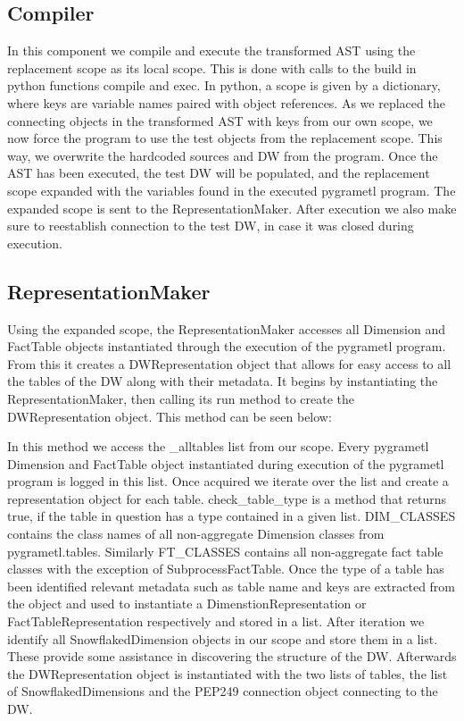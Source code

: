 \subsection{Compiler}
In this component we compile and execute the transformed AST using the replacement scope as its local scope. This is done with calls to the build in python functions compile and exec. In python, a scope is given by a dictionary, where keys are variable names paired with object references. As we replaced the connecting objects in the transformed AST with keys from our own scope, we now force the program to use the test objects from the replacement scope. This way, we overwrite the hardcoded sources and DW from the program. Once the AST has been executed, the test DW will be populated, and the replacement scope expanded with the variables found in the executed pygrametl program. The expanded scope is sent to the RepresentationMaker. After execution we also make sure to reestablish connection to the test DW, in case it was closed during execution.

\subsection{RepresentationMaker}
Using the expanded scope, the RepresentationMaker accesses all Dimension and FactTable objects instantiated through the execution of the pygrametl program. From this it creates a DWRepresentation object that allows for easy access to all the tables of the DW along with their metadata. It begins by instantiating the RepresentationMaker, then calling its run method to create the DWRepresentation object. This method can be seen below:


In this method we access the \_alltables list from our scope. Every pygrametl Dimension and FactTable object instantiated during execution of the pygrametl program is logged in this list. Once acquired we iterate over the list and create a representation object for each table. check\_table\_type is a method that returns true, if the table in question has a type contained in a given list. DIM\_CLASSES contains the class names of all non-aggregate Dimension classes from pygrametl.tables. Similarly FT\_CLASSES contains all non-aggregate fact table classes with the exception of SubprocessFactTable. Once the type of a table has been identified relevant metadata such as table name and keys are extracted from the object and used to instantiate a DimenstionRepresentation or FactTableRepresentation respectively and stored in a list. After iteration we identify all SnowflakedDimension objects in our scope and store them in a list. These provide some assistance in discovering the structure of the DW. Afterwards the DWRepresentation object is instantiated with the two lists of tables, the list of SnowflakedDimensions and the PEP249 connection object connecting to the DW.

